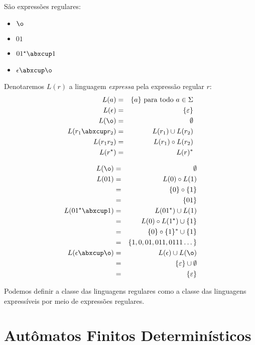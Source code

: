 \begin{example}
  São expressões regulares:
\begin{itemize}
\item[] $\o$
\item[] $01$
\item[] $01^\star\abxcup 1$
\item[] $\epsilon \abxcup \o$
\end{itemize}
\end{example}

Denotaremos $L(r)$ a linguagem {\em expressa} pela expressão regular $r$:
\begin{eqnarray*}
  L(a) & = & \{a\} \textrm{ para todo $a \in \Sigma$}\\
  L(\epsilon) & = & \{\varepsilon\}\\
  L(\o) & = & \emptyset\\
  L(r_1 \abxcup r_2) & = & L(r_1) \cup L(r_2)\\
  L(r_1r_2) & = & L(r_1) \circ L(r_2)\\
  L(r^\star) & = & L(r)^*
\end{eqnarray*}

\begin{eqnarray*}
L(\o) & = & \emptyset\\
L(01) & = & L(0) \circ L(1) \\
      & = & \{0\} \circ \{1\}\\
      & = & \{01\}\\
L(01^\star\abxcup 1) & = & L(01^\star) \cup L(1) \\
                     & = & L(0) \circ L(1^\star) \cup \{1\} \\
                     & = & \{0\}\circ\{1\}^* \cup \{1\} \\
                     & = & \{1, 0, 01, 011, 0111 \dots\}\\
L(\epsilon \abxcup \o) & = & L(\epsilon) \cup L(\o) \\
                       & = & \{\varepsilon\} \cup \emptyset \\
                       & = & \{\varepsilon\}
\end{eqnarray*}

Podemos definir a classe das linguagens regulares como a classe das linguagens expressíveis por meio de expressões regulares.

\section{Autômatos Finitos Determinísticos}
\label{sec:afd}

